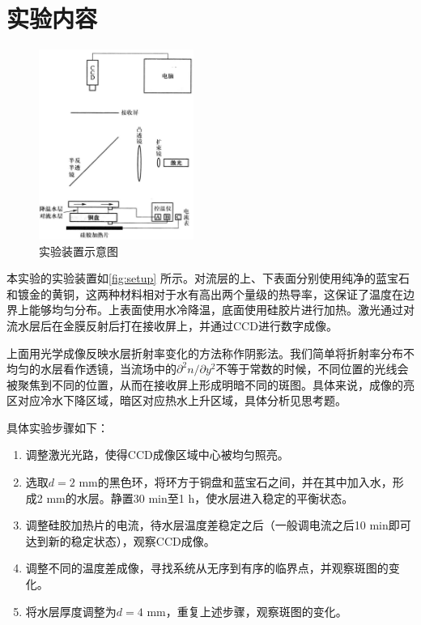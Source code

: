 \documentclass[font=default]{mpltx}
\begin{document}
\section{实验内容}
\begin{figure}
    \centering
    \includegraphics[width=0.45\textwidth]{fig/setup.png}
    \caption{实验装置示意图}
    \label{fig:setup}
\end{figure}
本实验的实验装置如\autoref{fig:setup} 所示。对流层的上、下表面分别使用纯净的蓝宝石和镀金的黄铜，这两种材料相对于水有高出两个量级的热导率，这保证了温度在边界上能够均匀分布。上表面使用水冷降温，底面使用硅胶片进行加热。激光通过对流水层后在金膜反射后打在接收屏上，并通过CCD进行数字成像。

上面用光学成像反映水层折射率变化的方法称作阴影法。我们简单将折射率分布不均匀的水层看作透镜，当流场中的$\partial^2 n/\partial y^2$不等于常数的时候，不同位置的光线会被聚焦到不同的位置，从而在接收屏上形成明暗不同的斑图。具体来说，成像的亮区对应冷水下降区域，暗区对应热水上升区域，具体分析见思考题。

具体实验步骤如下：
\begin{enumerate}
    \item 调整激光光路，使得CCD成像区域中心被均匀照亮。
    \item 选取$d=2$ mm的黑色环，将环方于铜盘和蓝宝石之间，并在其中加入水，形成2 mm的水层。静置30 min至1 h，使水层进入稳定的平衡状态。
    \item 调整硅胶加热片的电流，待水层温度差稳定之后（一般调电流之后10 min即可达到新的稳定状态），观察CCD成像。
    \item 调整不同的温度差成像，寻找系统从无序到有序的临界点，并观察斑图的变化。
    \item 将水层厚度调整为$d=4$ mm，重复上述步骤，观察斑图的变化。
\end{enumerate}
\end{document}
